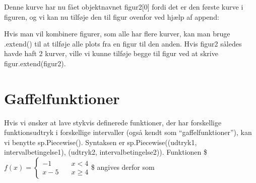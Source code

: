 \documentclass[letterpaper,10pt,english]{jupyterBook}
\begin{document}
\noindent{}

Denne kurve har nu fået objektnavnet figur2{[}0{]} fordi det er den første kurve i figuren, og vi kan nu tilføje den til figur ovenfor ved hjælp af append:

\begin{sphinxVerbatim}[commandchars=\\\{\}]
\PYG{p}{[}\PYG{p}{]}
\end{sphinxVerbatim}

\noindent{}

Hvis man vil kombinere figurer, som alle har flere kurver, kan man bruge .extend() til at tilføje alle plots fra en figur til den anden. Hvis figur2 således havde haft 2 kurver, ville vi kunne tilføje begge  til figur ved at skrive figur.extend(figur2).


\section{Gaffelfunktioner}
\label{\detokenize{notebooks/sympy/Notebook3_plot:gaffelfunktioner}}
Hvis vi ønsker at lave stykvis definerede funktioner, der har forskellige funktionsudtryk i forskellige intervaller (også kendt som “gaffelfunktioner”), kan vi benytte sp.Piecewise(). Syntaksen  er sp.Piecewise((udtryk1, intervalbetingelse1), (udtryk2, intervalbetingelse2)). Funktionen
\$\(f(x) = \begin{cases} -1 \quad &x < 4 \\ x - 5 \quad &x \geq 4\end{cases}\)\$
angives derfor som

\begin{sphinxVerbatim}[commandchars=\\\{\}]
         

        
\end{sphinxVerbatim}
\end{document}
